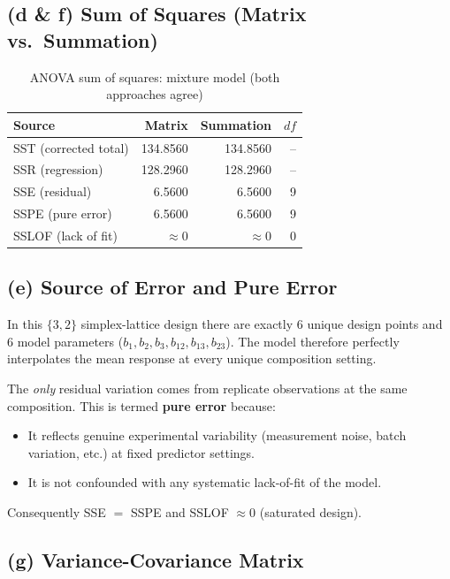 \documentclass[12pt,a4paper]{article}
\begin{document}
\subsection{(d \& f) Sum of Squares (Matrix vs.\ Summation)}

\begin{table}[H]
\centering
\caption{ANOVA sum of squares: mixture model (both approaches agree)}
\begin{tabular}{lrrr}
\toprule
Source & Matrix & Summation & $df$ \\
\midrule
SST (corrected total) & 134.8560 & 134.8560 & -- \\
SSR (regression)      & 128.2960 & 128.2960 & -- \\
SSE (residual)        &   6.5600 &   6.5600 &  9 \\
SSPE (pure error)     &   6.5600 &   6.5600 &  9 \\
SSLOF (lack of fit)   & $\approx 0$ & $\approx 0$ &  0 \\
\bottomrule
\end{tabular}
\end{table}

\subsection{(e) Source of Error and Pure Error}

In this $\{3,2\}$ simplex-lattice design there are exactly 6 unique design points and
6 model parameters ($b_1, b_2, b_3, b_{12}, b_{13}, b_{23}$). The model therefore
perfectly interpolates the mean response at every unique composition setting.

The \emph{only} residual variation comes from replicate observations at the same
composition. This is termed \textbf{pure error} because:
\begin{itemize}
  \item It reflects genuine experimental variability (measurement noise, batch
        variation, etc.) at fixed predictor settings.
  \item It is not confounded with any systematic lack-of-fit of the model.
\end{itemize}
Consequently SSE $=$ SSPE and SSLOF $\approx 0$ (saturated design).

\subsection{(g) Variance-Covariance Matrix}
\end{document}
